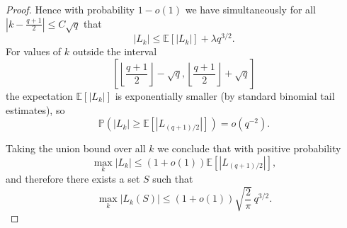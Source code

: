 \documentclass[10pt]{article}
\newcommand{\E}{\mathbb{E}}
\theoremstyle{definition}
\newcommand{\zs}[1]{\textcolor{magenta}{\textbf{#1}}}
\begin{document}
\begin{proof}
		Hence with probability $1-o(1)$ we have simultaneously for all
		$\left|k-\frac{q+1}{2}\right|\le C\sqrt q$ that
		\[
		|L_k|\le \E [|L_k|]+\lambda q^{3/2}.
		\]
		For values of $k$ outside the interval
		\[
		\left[\left\lfloor \frac{q+1}{2}\right\rfloor-\sqrt q,\left\lfloor \frac{q+1}{2}\right\rfloor+\sqrt q\right]
		\]
		the expectation $\mathbb E[|L_k|]$ is exponentially smaller
		(by standard binomial tail estimates), so
		\[
		\mathbb{P}(|L_k|\ge \mathbb E[|L_{(q+1)/2}|]) = o(q^{-2}).
		\]
		
		Taking the union bound over all $k$ we conclude that with positive
		probability
		\[
		\max_k |L_k|
		\le
		(1+o(1))\mathbb E[|L_{(q+1)/2}|],
		\]
		and therefore there exists a set $S$ such that
		\[
		\max_k |L_k(S)|
		\le
		(1+o(1))\sqrt{\frac{2}{\pi}}\,q^{3/2}.
		\]
	\end{proof}
	\fi
	
	
	
	
\end{document}
